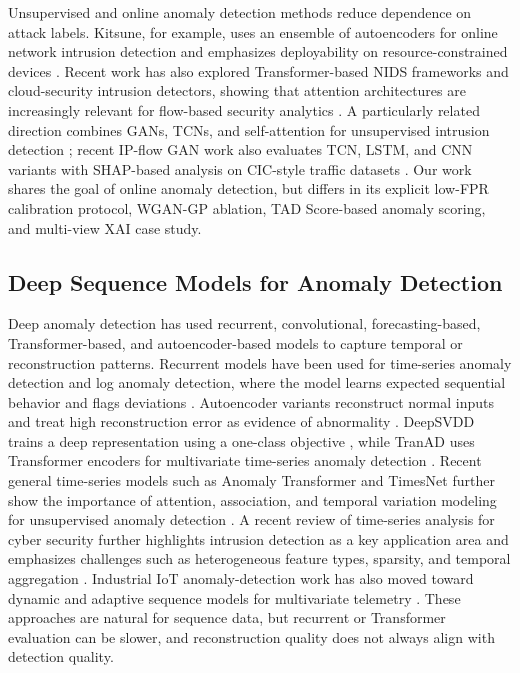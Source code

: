 \documentclass[conference]{IEEEtran}
\newcommand{\tad}{TAD Score}
\begin{document}
Unsupervised and online anomaly detection methods reduce dependence on attack labels. Kitsune, for example, uses an ensemble of autoencoders for online network intrusion detection and emphasizes deployability on resource-constrained devices \cite{mirsky2018kitsune}. Recent work has also explored Transformer-based NIDS frameworks and cloud-security intrusion detectors, showing that attention architectures are increasingly relevant for flow-based security analytics \cite{manocchio2024flowtransformer,long2024transformercloud,xi2024multiscale}. A particularly related direction combines GANs, TCNs, and self-attention for unsupervised intrusion detection \cite{araujo2023unsupervised}; recent IP-flow GAN work also evaluates TCN, LSTM, and CNN variants with SHAP-based analysis on CIC-style traffic datasets \cite{ruffo2025ganipflow}. Our work shares the goal of online anomaly detection, but differs in its explicit low-FPR calibration protocol, WGAN-GP ablation, \tad{}-based anomaly scoring, and multi-view XAI case study.

\subsection{Deep Sequence Models for Anomaly Detection}
Deep anomaly detection has used recurrent, convolutional, forecasting-based, Transformer-based, and autoencoder-based models to capture temporal or reconstruction patterns. Recurrent models have been used for time-series anomaly detection and log anomaly detection, where the model learns expected sequential behavior and flags deviations \cite{malhotra2016lstm,du2017deeplog}. Autoencoder variants reconstruct normal inputs and treat high reconstruction error as evidence of abnormality \cite{sakurada2014autoencoder,an2015vae}. DeepSVDD trains a deep representation using a one-class objective \cite{ruff2018deep}, while TranAD uses Transformer encoders for multivariate time-series anomaly detection \cite{tuli2022tranad}. Recent general time-series models such as Anomaly Transformer and TimesNet further show the importance of attention, association, and temporal variation modeling for unsupervised anomaly detection \cite{xu2022anomalytransformer,wu2023timesnet}. A recent review of time-series analysis for cyber security further highlights intrusion detection as a key application area and emphasizes challenges such as heterogeneous feature types, sparsity, and temporal aggregation \cite{landauer2025timeseriessecurity}. Industrial IoT anomaly-detection work has also moved toward dynamic and adaptive sequence models for multivariate telemetry \cite{kong2025dadn}. These approaches are natural for sequence data, but recurrent or Transformer evaluation can be slower, and reconstruction quality does not always align with detection quality.
\end{document}
